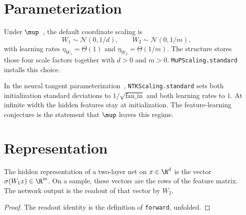 \chapter{Parameterization}

\begin{definition}\label{def:mup_scaling}
\leanok
{}
Under $\mup$~\cite{yang2021tensor4,yang2022tensor5}, the default coordinate scaling is
\[
W_1\sim\mathcal{N}(0,1/d),\qquad
W_2\sim\mathcal{N}(0,1/m),
\]
with learning rates $\eta_{W_1}=\Theta(1)$ and $\eta_{W_2}=\Theta(1/m)$. The structure stores those four scale factors together with $d>0$ and $m>0$. \texttt{MuPScaling.standard} installs this choice.
\end{definition}

\begin{definition}\label{def:ntk_scaling}
\leanok
{}
In the neural tangent parameterization~\cite{jacot2018neural,yang2021tensor4}, \texttt{NTKScaling.standard} sets both initialization standard deviations to $1/\sqrt{\mathrm{fan\_in}}$ and both learning rates to $1$. At infinite width the hidden features stay at initialization. The feature-learning conjecture is the statement that $\mup$ leaves this regime.
\end{definition}

\chapter{Representation}

\begin{definition}\label{def:features}
\leanok
{}
The hidden representation of a two-layer net on $x\in\R^d$ is the vector $\sigma(W_1 x)\in\R^m$. On a sample, these vectors are the rows of the feature matrix. The network output is the readout of that vector by $W_2$.
\end{definition}
\begin{proof}
\leanok
The readout identity is the definition of \texttt{forward}, unfolded.
\end{proof}


